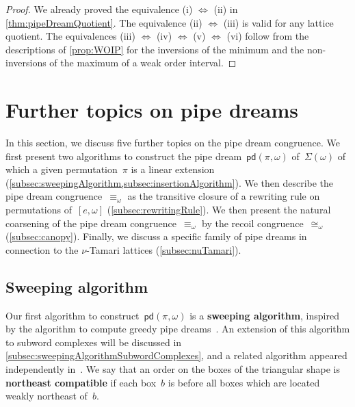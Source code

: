 \documentclass[reqno]{amsart}
\theoremstyle{definition}
\newcommand{\defn}[1]{\textbf{\textsf{\color{PineGreen} #1}}} %
\newcommand{\acyclicPipeDreams}{\Sigma} %
\newcommand{\insertion}[2]{\mathsf{pd}(#1,#2)} %
\begin{document}
\begin{proof}
We already proved the equivalence (i) $\Leftrightarrow$ (ii) in \cref{thm:pipeDreamQuotient}.
The equivalence (ii) $\Leftrightarrow$ (iii) is valid for any lattice quotient.
The equivalences (iii) $\Leftrightarrow$ (iv) $\Leftrightarrow$ (v) $\Leftrightarrow$ (vi) follow from the descriptions of \cref{prop:WOIP} for the inversions of the minimum and the non-inversions of the maximum of a weak order interval.
\end{proof}


\section{Further topics on pipe dreams}
\label{sec:furtherTopics}

In this section, we discuss five further topics on the pipe dream congruence.
We first present two algorithms to construct the pipe dream~$\insertion{\pi}{\omega}$ of~$\acyclicPipeDreams(\omega)$ of which a given permutation~$\pi$ is a linear extension (\cref{subsec:sweepingAlgorithm,subsec:insertionAlgorithm}).
We then describe the pipe dream congruence~$\equiv_\omega$ as the transitive closure of a rewriting rule on permutations of~$[e, \omega]$ (\cref{subsec:rewritingRule}).
We then present the natural coarsening of the pipe dream congruence~$\equiv_\omega$ by the recoil congruence~$\cong_\omega$ (\cref{subsec:canopy}).
Finally, we discuss a specific family of pipe dreams in connection to the $\nu$-Tamari lattices (\cref{subsec:nuTamari}).


\subsection{Sweeping algorithm}
\label{subsec:sweepingAlgorithm}

Our first algorithm to construct~$\insertion{\pi}{\omega}$ is a \defn{sweeping algorithm}, inspired by the algorithm to compute greedy pipe dreams~\cite{PilaudPocchiola, PilaudStump-ELlabelings}.
An extension of this algorithm to subword complexes will be discussed in \cref{subsec:sweepingAlgorithmSubwordComplexes}, and a related algorithm appeared independently in~\cite{JahnStump}.
We say that an order on the boxes of the triangular shape is \defn{northeast compatible} if each box~$b$ is before all boxes which are located weakly northeast of~$b$.
\end{document}
